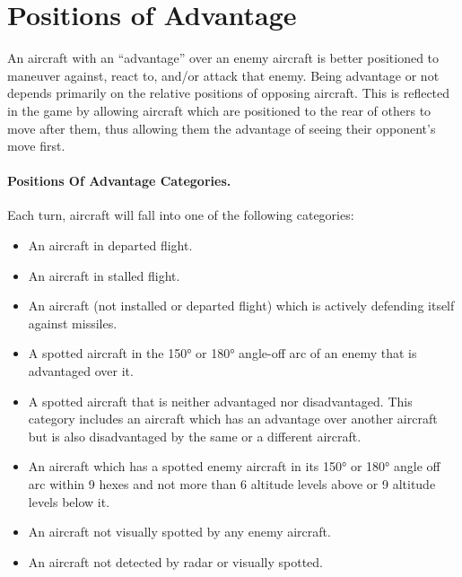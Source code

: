 \section
{Positions of Advantage}

An aircraft with an “advantage” over an enemy aircraft is better positioned to maneuver against, react to, and/or attack that enemy. Being advantage or not depends primarily on the relative positions of opposing aircraft. This is reflected in the game by allowing aircraft which are positioned to the rear of others to move after them, thus allowing them the advantage of seeing their opponent's move first.

\paragraph{Positions Of Advantage Categories.} Each turn, aircraft will fall into one of the following categories:

\begin{itemize}

    \item{} An aircraft in departed flight.

    \item{} An aircraft in stalled flight.

    \item{} An aircraft (not installed or departed flight) which is actively defending itself against missiles.

    \item{} A spotted aircraft in the 150° or 180° angle-off arc of an enemy that is advantaged over it.

    \item{} A spotted aircraft that is neither advantaged nor disadvantaged. This category includes an aircraft which has an advantage over another aircraft but is also disadvantaged by the same or a different aircraft.

    \item{} An aircraft which has a spotted enemy aircraft in its 150° or 180° angle off arc within 9 hexes and not more than 6 altitude levels above or 9 altitude levels below it. 

    \item{} An aircraft not visually spotted by any enemy aircraft.

    \item{} An aircraft not detected by radar or visually spotted.

\end{itemize}

